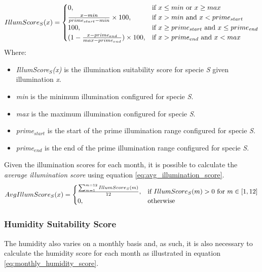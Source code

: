 \begin{equation}
\centering
IllumScore_{S}(x) = 
\begin{cases}
    0, & \text{if } x \leq min \text{ or } x \geq max \\
    \frac{x - min}{prime_{start} - min} \times 100, & \text{if } x > min \text{ and } x < prime_{start} \\
    100, & \text{if } x \geq prime_{start} \text{ and } x \leq prime_{end} \\
    (1 - \frac{x - prime_{end}}{max-prime_{end}}) \times 100, & \text{if } x > prime_{end} \text{ and } x < max \\
\end{cases}
\label{eq:monthly_illumination_score}
\end{equation}
Where:
\begin{itemize}
\item \textit{IllumScore$_{S}$(x)} is the illumination suitability score for specie \textit{S} given illumination \textit{x}.
\item \textit{min} is the minimum illumination configured for specie \textit{S}.
\item \textit{max} is the maximum illumination configured for specie \textit{S}.
\item \textit{prime$_{start}$} is the start of the prime illumination range configured for specie \textit{S}.
\item \textit{prime$_{end}$} is the end of the prime illumination range configured for specie \textit{S}.
\end{itemize}

Given the illumination scores for each month, it is possible to calculate the \textit{average illumination score} using equation \ref{eq:avg_illumination_score}.
\begin{equation}
\centering
AvgIllumScore_{S}(x) =
\begin{cases}
	\frac{\sum_{m=1}^{m=12} IllumScore_{S}(m)}{12}, & \text{if } IllumScore_{S}(m) > 0 \text{ for } m \in [1,12] \\
    0,              & \text{otherwise}
\end{cases}
\label{eq:avg_illumination_score}
\end{equation}

\subsubsection{Humidity Suitability Score}

The humidity also varies on a monthly basis and, as such, it is also necessary to calculate the humidity score for each month as illustrated in equation \ref{eq:monthly_humidity_score}.

